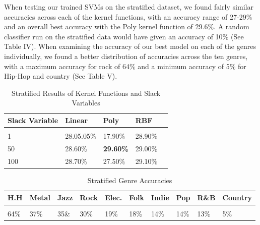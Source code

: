 \documentclass[journal]{IEEEtran}
\begin{document}
When testing our trained SVMs on the stratified dataset, we found fairly similar accuracies across each of the kernel functions, with an accuracy range of 27-29\% and an overall best accuracy with the Poly kernel function of 29.6\%. A random classifier run on the stratified data would have given an accuracy of 10\% (See Table IV). When examining the accuracy of our best model on each of the genres individually, we found a better distribution of accuracies across the ten genres, with a maximum accuracy for rock of 64\%  and a minimum accuracy of 5\% for Hip-Hop and country (See Table V).

\begin{table}[h!]
    \label{tab:table1}
    \caption{Stratified Results of Kernel Functions and Slack Variables}
    \begin{tabular}{l|l|l|ll}
      \textbf{Slack Variable} & \textbf{Linear} & \textbf{Poly} & \textbf{RBF}\\

      \hline
      \\
	1 & 28.05.05\% & 17.90\% & 28.90\%\\
	50 & 28.60\% & \textbf{29.60\%} & 29.00\%\\
	100 & 28.70\% & 27.50\% & 29.10\%\\

    \end{tabular}
\end{table}

\begin{table}[h!]
    \label{tab:table1}
    \caption{Stratified Genre Accuracies}
    \begin{tabular}{|m{0.4cm}|m{0.5cm}|m{0.4cm}|m{0.45cm}|m{0.4cm}|m{0.4cm}|m{0.45cm}|m{0.4cm}|m{0.45cm}|m{0.4cm}}
    \textbf{H.H} & \textbf{Metal} & \textbf{Jazz} & \textbf{Rock} & \textbf{Elec.} & \textbf{Folk} & \textbf{Indie} & \textbf{Pop} & \textbf{R\&B} & \textbf{Country}\\
      \hline
      \\
	64\% & 37\% & 35\& & 30\% & 19\% & 18\% & 14\% & 14\% & 13\% & 5\%\\

    \end{tabular}
\end{table}
\end{document}
